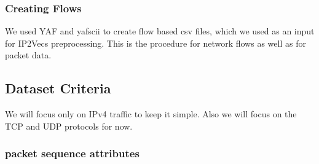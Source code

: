 \documentclass[
	ngerman,
	ruledheaders=section,%
	class=report,%
	thesis={type=bachelor},%
	accentcolor=9c,%
	custommargins=true,%
	marginpar=false,%
	parskip=half-,%
	fontsize=11pt,%
]{tudapub}
\begin{document}




\subsubsection{Creating Flows}

We used YAF and yafscii to create flow based csv files, which we used as an input for IP2Vecs preprocessing.
This is the procedure for network flows as well as for packet data.

\subsection{Dataset Criteria}

We will focus only on IPv4 traffic to keep it simple.
Also we will focus on the TCP and UDP protocols for now.

\subsubsection{packet sequence attributes}
\end{document}
